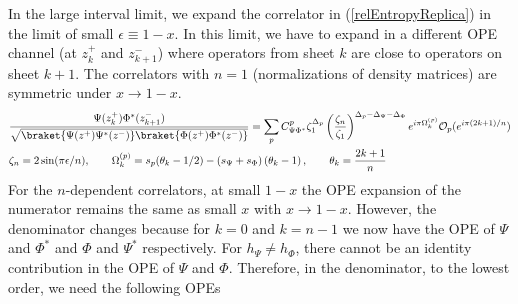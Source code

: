 \documentclass[11pt]{article}
\newcommand{\ep}{\epsilon}
\newcommand{\mO}{\mathcal{O}}
\newcommand{\nn}{\nonumber}
\newcommand{\lb}{\left(}
\newcommand{\rb}{\right)}
\newcommand{\NL}[1]{\textcolor{blue}{#1}}
\begin{document}
In the large interval limit, we expand the correlator in (\ref{relEntropyReplica}) in the limit of small $\ep\equiv 1-x$. In this limit, we have to expand in a different OPE channel (at $z_k^+$ and $z_{k+1}^-$) where operators from sheet $k$ are close to operators on sheet $k+1$. The correlators with $n=1$ (normalizations of density matrices) are symmetric under $x\to 1-x$. 
\begin{align}
 &\frac{\Psi(z_k^{+})\Phi^*(z_{k+1}^{-})}{\sqrt{\braket{\Psi(z^+)\Psi^*(z^-)}\braket{\Phi(z^+)\Phi^*(z^-)}}}=\sum_p C^p_{\Psi \Phi^*}\zeta_1^{\Delta_p}\lb \frac{\zeta_n}{\zeta_1}\rb^{\Delta_p-\Delta_{\Psi}-\Delta_{\Phi}}e^{i\pi\Omega_k^{(p)}}\mO_p(e^{i\pi(2k+1)/n})\nn\\
 &\zeta_n=2\sin(\pi\ep/n),\qquad \Omega^{(p)}_k=s_p(\theta_k-1/2)-(s_{\Psi}+s_{\Phi})\lb \theta_k-1\rb,\qquad \theta_k=\frac{2k+1}{n}
\end{align}
For the $n$-dependent correlators, at small $1-x$ the OPE expansion of the numerator remains the same as small $x$ with $x\to 1-x$. However, the denominator changes because for $k=0$ and $k=n-1$ we now have the OPE of $\Psi$ and $\Phi^*$ and $\Phi$ and $\Psi^*$ respectively.  For $h_\Psi\neq h_\Phi$, there cannot be an identity contribution in the OPE of $\Psi$ and $\Phi$. Therefore, in the denominator, to the lowest order, we need the following OPEs 
\end{document}
